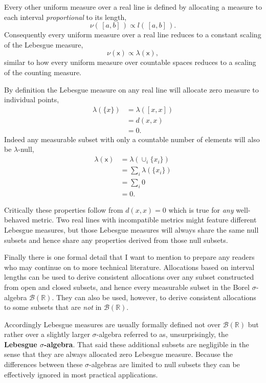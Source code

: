 \documentclass[
  letterpaper,
  DIV=11,
  numbers=noendperiod]{scrartcl}
\begin{document}
Every other uniform measure over a real line is defined by allocating a
measure to each interval \emph{proportional} to its length, \[
\nu( \, [a, b] \, ) \propto l( \, [a, b] \, ).
\] Consequently every uniform measure over a real line reduces to a
constant scaling of the Lebesgue measure, \[
\nu ( \mathsf{x} ) \propto \lambda ( \mathsf{x} ),
\] similar to how every uniform measure over countable spaces reduces to
a scaling of the counting measure.

By definition the Lebesgue measure on any real line will allocate zero
measure to individual points, \begin{align*}
\lambda(\{ x \})
&= \lambda([x, x])
\\
&= d(x, x)
\\
&= 0.
\end{align*} Indeed any measurable subset with only a countable number
of elements will also be \(\lambda\)-null, \begin{align*}
\lambda(\mathsf{x})
&=
\lambda(\cup_{i} \{ x_{i} \} )
\\
&=
\sum_{i} \lambda( \{ x_{i} \} )
\\
&=
\sum_{i} 0
\\
&=
0.
\end{align*}

Critically these properties follow from \(d(x, x) = 0\) which is true
for \emph{any} well-behaved metric. Two real lines with incompatible
metrics might feature different Lebesgue measures, but those Lebesgue
measures will always share the same null subsets and hence share any
properties derived from those null subsets.

Finally there is one formal detail that I want to mention to prepare any
readers who may continue on to more technical literature. Allocations
based on interval lengths can be used to derive consistent allocations
over any subset constructed from open and closed subsets, and hence
every measurable subset in the Borel \(\sigma\)-algebra
\(\mathcal{B}(\mathbb{R})\). They can also be used, however, to derive
consistent allocations to some subsets that are \emph{not} in
\(\mathcal{B}(\mathbb{R})\).

Accordingly Lebesgue measures are usually formally defined not over
\(\mathcal{B}(\mathbb{R})\) but rather over a slightly larger
\(\sigma\)-algebra referred to as, unsurprisingly, the \textbf{Lebesgue
\(\sigma\)-algebra}. That said these additional subsets are negligible
in the sense that they are always allocated zero Lebesgue measure.
Because the differences between these \(\sigma\)-algebras are limited to
null subsets they can be effectively ignored in most practical
applications.
\end{document}
